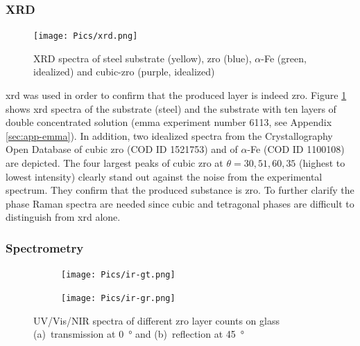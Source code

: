 \subsubsection{XRD}
\begin{figure}
	\centering
	\texttt{[image: Pics/xrd.png]}
	\caption{XRD spectra of steel substrate (yellow), \gls{zro} (blue), $\alpha$-Fe (green, idealized) and cubic-\gls{zro} (purple, idealized)\cite{gkatz1971xray}}
	\label{fig:xrd}
\end{figure}

\Gls{xrd} was used in order to confirm that the produced layer is indeed \gls{zro}. 
Figure \ref{fig:xrd} shows \gls{xrd} spectra of the substrate (steel) and 
the substrate with ten layers of double concentrated solution (\gls{emma} experiment number 6113, see Appendix \ref{sec:app-emma}).
In addition, two idealized spectra from the Crystallography Open Database of cubic \gls{zro} (COD ID 1521753\cite{gkatz1971xray}) and of $\alpha$-Fe (COD ID 1100108) are depicted.
%
The four largest peaks of cubic \gls{zro} at $\theta=30, 51, 60, 35$ (highest to lowest intensity) clearly stand out against the noise from the experimental spectrum. %
They confirm that the produced substance is \gls{zro}.
To further clarify the phase Raman spectra are needed since cubic and tetragonal phases are difficult to distinguish from \gls{xrd} alone\cite{Purohit2006Combustion}.

\subsubsection{Spectrometry}

\begin{figure}[htb]
    \centering
    \begin{subfigure}{.49\textwidth}
        \centering
        \texttt{[image: Pics/ir-gt.png]}
		\caption{}%
		\label{fig:ir-gt}
    \end{subfigure}
    \begin{subfigure}{.49\textwidth}
        \centering
        \texttt{[image: Pics/ir-gr.png]}
		\caption{}%
		\label{fig:ir-gr}
    \end{subfigure}
	\label{fig:ir}
	\caption{UV/Vis/NIR spectra of different \gls{zro} layer counts on glass 
	(a)~transmission at \SI{0}{\degree} and (b)~reflection at \SI{45}{\degree} 
	} 
\end{figure}

